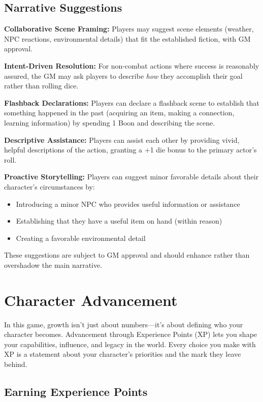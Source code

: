 \documentclass[11pt,twoside,openany]{book}
\begin{document}
\section*{Narrative Suggestions} 

\textbf{Collaborative Scene Framing:} Players may suggest scene elements (weather, NPC reactions, environmental details) that fit the established fiction, with GM approval.

\textbf{Intent-Driven Resolution:} For non-combat actions where success is reasonably assured, the GM may ask players to describe \emph{how} they accomplish their goal rather than rolling dice.

\textbf{Flashback Declarations:} Players can declare a flashback scene to establish that something happened in the past (acquiring an item, making a connection, learning information) by spending 1 Boon and describing the scene.

\textbf{Descriptive Assistance:} Players can assist each other by providing vivid, helpful descriptions of the action, granting a +1 die bonus to the primary actor's roll.

\textbf{Proactive Storytelling:} Players can suggest minor favorable details about their character's circumstances by:
\begin{itemize}
\item Introducing a minor NPC who provides useful information or assistance
\item Establishing that they have a useful item on hand (within reason)
\item Creating a favorable environmental detail
\end{itemize}

These suggestions are subject to GM approval and should enhance rather than overshadow the main narrative.

\chapter{Character Advancement} \label{ch:advancement}

In this game, growth isn't just about numbers---it's about defining who your character becomes. Advancement through Experience Points (XP) lets you shape your capabilities, influence, and legacy in the world. Every choice you make with XP is a statement about your character's priorities and the mark they leave behind.

\section*{Earning Experience Points} 
\end{document}

